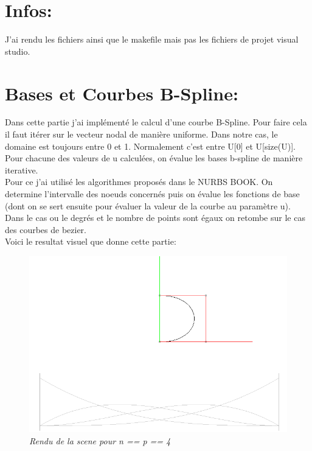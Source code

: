 \documentclass[12pt,letterpaper]{article}
\begin{document}
    
     
	\newpage
	
    \section{Infos:}
	J'ai rendu les fichiers ainsi que le makefile mais pas les fichiers de projet visual studio.

    \section{Bases et Courbes B-Spline:}
	\setlength{\parindent}{1cm}

	Dans cette partie j'ai implémenté le calcul d'une courbe B-Spline. Pour faire cela il faut itérer sur le vecteur nodal de manière uniforme. Dans notre cas, le domaine est toujours entre 0 et 1. Normalement c'est entre U[0] et U[size(U)].\\

	Pour chacune des valeurs de u calculées, on évalue les bases b-spline de manière iterative.\\

	Pour ce j'ai utilisé les algorithmes proposés dans le NURBS BOOK. On determine l'intervalle des noeuds concernés puis on évalue les fonctions de base (dont on se sert ensuite pour évaluer la valeur de la courbe au paramètre u).\\
	
	Dans le cas ou le degrés et le nombre de points sont égaux on retombe sur le cas des courbes de bezier.\\
	Voici le resultat visuel que donne cette partie:
\begin{figure}[h!]
	\centering
	\includegraphics[scale=0.3]{images/img1.png}
	\caption{\textit{Rendu de la scene pour n == p == 4}}
\end{figure}
	
\end{document}

